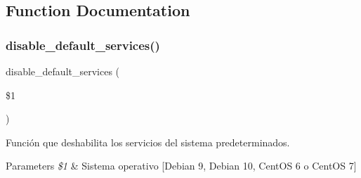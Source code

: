 \subsection{Function Documentation}
\mbox{\label{Configuraciones__Generales_8sh_ad83bd5e5089ad1546035126564e2a5d1}} 
\subsubsection{\texorpdfstring{disable\+\_\+default\+\_\+services()}{disable\_default\_services()}}
{\footnotesize\ttfamily disable\+\_\+default\+\_\+services (\begin{DoxyParamCaption}\item[{}]{\$1 }\end{DoxyParamCaption})}



Función que deshabilita los servicios del sistema predeterminados. 


\begin{DoxyParams}{Parameters}
{\em \$1} & Sistema operativo \mbox{[}\textquotesingle{}Debian 9\textquotesingle{}, \textquotesingle{}Debian 10\textquotesingle{}, \textquotesingle{}Cent\+OS 6\textquotesingle{} o \textquotesingle{}Cent\+OS 7\textquotesingle{}\mbox{]} \\
\hline
\end{DoxyParams}
